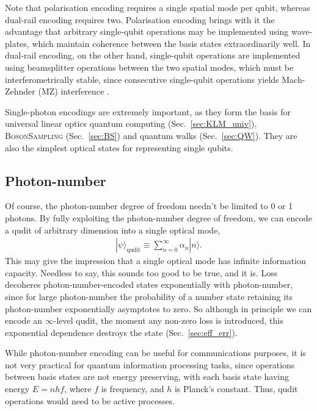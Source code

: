 \documentclass[aps,rmp,twocolumn,amsmath,amssymb,nofootinbib,superscriptaddress,longbibliography,floatfix,table-of-contents,eqsecnum]{revtex4-1}
\newcommand{\ket}[1]{|#1\rangle}
\begin{document}
Note that polarisation encoding requires a single spatial mode per qubit, whereas dual-rail encoding requires two. Polarisation encoding brings with it the advantage that arbitrary single-qubit operations may be implemented using wave-plates, which maintain coherence between the basis states extraordinarily well. In dual-rail encoding, on the other hand, single-qubit operations are implemented using beamsplitter operations between the two spatial modes, which must be interferometrically stable, since consecutive single-qubit operations yields Mach-Zehnder (MZ) interference \cite{bib:Zehnder1, bib:Zehnder2}.

Single-photon encodings are extremely important, as they form the basis for universal linear optics quantum computing (Sec.~\ref{sec:KLM_univ}), \textsc{BosonSampling} (Sec.~\ref{sec:BS}) and quantum walks (Sec.~\ref{sec:QW}). They are also the simplest optical states for representing single qubits.

%
%

\subsection{Photon-number} 

Of course, the photon-number degree of freedom needn't be limited to 0 or 1 photons. By fully exploiting the photon-number degree of freedom, we can encode a qudit of arbitrary dimension into a single optical mode,
\begin{align} \label{eq:number_qudit}
\ket\psi_\text{qudit} \equiv \sum_{n=0}^\infty \alpha_n \ket{n}.
\end{align}
This may give the impression that a single optical mode has infinite information capacity. Needless to say, this sounds too good to be true, and it is. Loss decoheres photon-number-encoded states exponentially with photon-number, since for large photon-number the probability of a number state retaining its photon-number exponentially asymptotes to zero. So although in principle we can encode an $\infty$-level qudit, the moment any non-zero loss is introduced, this exponential dependence destroys the state (Sec.~\ref{sec:eff_err}).

While photon-number encoding can be useful for communications purposes, it is not very practical for quantum information processing tasks, since operations between basis states are not energy preserving, with each basis state having energy \mbox{$E=nhf$}, where $f$ is frequency, and $h$ is Planck's constant. Thus, qudit operations would need to be active processes.
\end{document}
